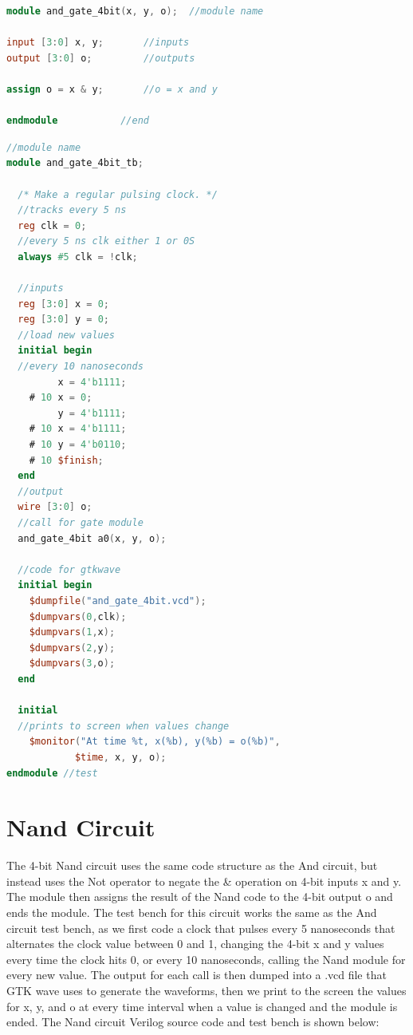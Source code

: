 \documentclass[runningheads, 12pt]{report}
\begin{document}
\begin{lstlisting}[language=Verilog, caption={And Circuit Verilog}]
module and_gate_4bit(x, y, o);	//module name

input [3:0] x, y;		//inputs
output [3:0] o;			//outputs

assign o = x & y;		//o = x and y

endmodule			//end
\end{lstlisting}

\begin{lstlisting}[language=Verilog, caption={And Circuit Test Bench}]
//module name
module and_gate_4bit_tb;	

  /* Make a regular pulsing clock. */	
  //tracks every 5 ns
  reg clk = 0;
  //every 5 ns clk either 1 or 0S
  always #5 clk = !clk;			
  
  //inputs
  reg [3:0] x = 0;	
  reg [3:0] y = 0;
  //load new values
  initial begin				
  //every 10 nanoseconds
    	 x = 4'b1111;			
    # 10 x = 0; 
    	 y = 4'b1111;
    # 10 x = 4'b1111;			
    # 10 y = 4'b0110;
    # 10 $finish;
  end
  //output
  wire [3:0] o;			
  //call for gate module	
  and_gate_4bit a0(x, y, o);
  
  //code for gtkwave
  initial begin				
    $dumpfile("and_gate_4bit.vcd");
    $dumpvars(0,clk);
    $dumpvars(1,x);
    $dumpvars(2,y);
    $dumpvars(3,o);
  end
  
  initial				
  //prints to screen when values change
    $monitor("At time %t, x(%b), y(%b) = o(%b)",  
    		$time, x, y, o);
endmodule //test
\end{lstlisting}

	\section{Nand Circuit}
	
	The 4-bit Nand circuit uses the same code structure as the And circuit, but instead uses the Not operator to negate the & operation on 4-bit inputs x and y. The module then assigns the result of the Nand code to the 4-bit output o and ends the module. The test bench for this circuit works the same as the And circuit test bench, as we first code a clock that pulses every 5 nanoseconds that alternates the clock value between 0 and 1, changing the 4-bit x and y values every time the clock hits 0, or every 10 nanoseconds, calling the Nand module for every new value. The output for each call is then dumped into a .vcd file that GTK wave uses to generate the waveforms, then we print to the screen the values for x, y, and o at every time interval when a value is changed and the module is ended. The Nand circuit Verilog source code and test bench is shown below:
\end{document}
